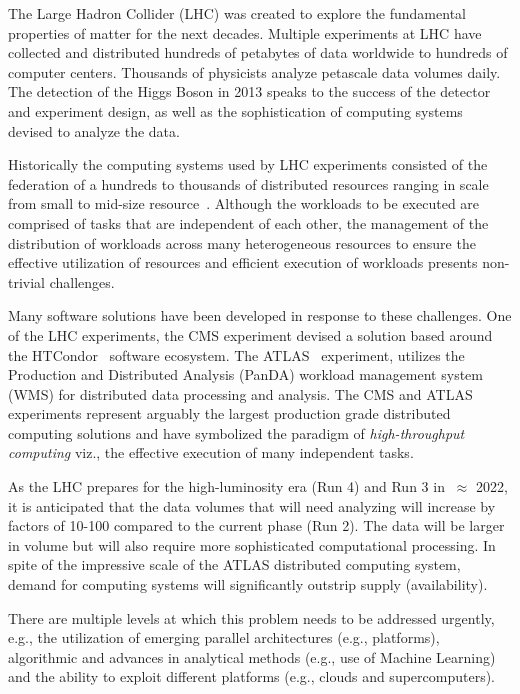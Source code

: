 The Large Hadron Collider (LHC) was created to explore the fundamental
properties of matter for the next decades.   Multiple experiments at LHC have
collected and distributed hundreds of petabytes of data worldwide to hundreds
of computer centers. Thousands of physicists analyze petascale data volumes
daily. The detection of the Higgs Boson in 2013 speaks to the success of the
detector and experiment design, as well as the sophistication of computing
systems devised to analyze the data.

Historically the computing systems used by LHC experiments consisted of the
federation of a hundreds to thousands of distributed resources \textemdash{}
ranging in scale from small to mid-size resource~\cite{foster2003grid}.
Although the workloads to be executed are comprised of tasks that are
independent of each other, the management of the distribution of 
workloads across many heterogeneous resources to ensure the effective
utilization of resources and efficient execution of workloads presents non-
trivial challenges.

Many software solutions have been developed in response to these challenges.
One of the LHC experiments, the CMS experiment devised a solution based around
the HTCondor~\cite{XX} software ecosystem. The ATLAS~\cite{Aad:2008}
experiment, utilizes the Production and Distributed Analysis (PanDA) workload
management system~\cite{Maeno2011} (WMS) for distributed data processing and
analysis. The CMS and ATLAS experiments represent arguably the largest
production grade distributed computing solutions and have symbolized the
paradigm of {\it high-throughput computing} viz., the effective execution of
many independent tasks.

As the LHC prepares for the high-luminosity era (Run 4) and Run 3 in
$~\approx$ 2022, it is anticipated that the data volumes that will need
analyzing will increase by factors of 10-100  compared to the current phase
(Run 2). The data will be larger in volume but will also require more
sophisticated computational processing. In spite of the impressive scale of
the ATLAS distributed computing system, demand for computing systems will
significantly outstrip supply (availability).

There are multiple levels at which this problem needs to be addressed
urgently, e.g., the utilization of emerging parallel architectures (e.g.,
platforms), algorithmic and advances in analytical methods (e.g., use of
Machine Learning) and the ability to exploit different platforms (e.g., clouds
and supercomputers).

